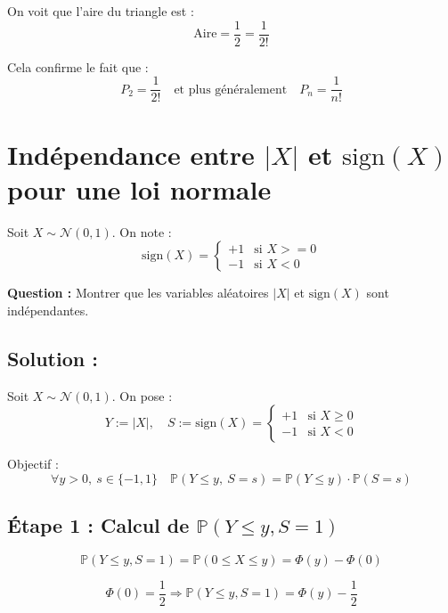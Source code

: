 \vspace{1em}

On voit que l’aire du triangle est :
\[
\text{Aire} = \frac{1}{2} = \frac{1}{2!}
\]

Cela confirme le fait que :
\[
P_2 = \frac{1}{2!}
\quad \text{et plus généralement} \quad
P_n = \frac{1}{n!}
\]


\section{Indépendance entre \(|X|\) et \(\mathrm{sign}(X)\) pour une loi normale}
\begin{exerciseBox}
Soit \( X \sim \mathcal{N}(0, 1) \). On note :
\[
\mathrm{sign}(X) =
\begin{cases}
+1 & \text{si } X >= 0 \\
-1 & \text{si } X < 0
\end{cases}
\]

\textbf{Question :} Montrer que les variables aléatoires \( |X| \) et \( \mathrm{sign}(X) \) sont indépendantes.
\end{exerciseBox}


\subsection*{Solution :}



Soit \( X \sim \mathcal{N}(0,1) \). On pose :
\[
Y := |X|, \quad S := \mathrm{sign}(X) =
\begin{cases}
+1 & \text{si } X \geq 0 \\
-1 & \text{si } X < 0
\end{cases}
\]

\vspace{0.5em}
Objectif :
\[
\forall y > 0,\ s \in \{-1, 1\} \quad
\mathbb{P}(Y \leq y,\ S = s) = \mathbb{P}(Y \leq y)\cdot \mathbb{P}(S = s)
\]


\subsection*{Étape 1 : Calcul de \( \mathbb{P}(Y \leq y, S = 1) \)}

\[
\mathbb{P}(Y \leq y, S = 1) = \mathbb{P}(0 \leq X \leq y) = \Phi(y) - \Phi(0)
\]

\[
\Phi(0) = \frac{1}{2} \Rightarrow \mathbb{P}(Y \leq y, S = 1) = \Phi(y) - \frac{1}{2}
\]

